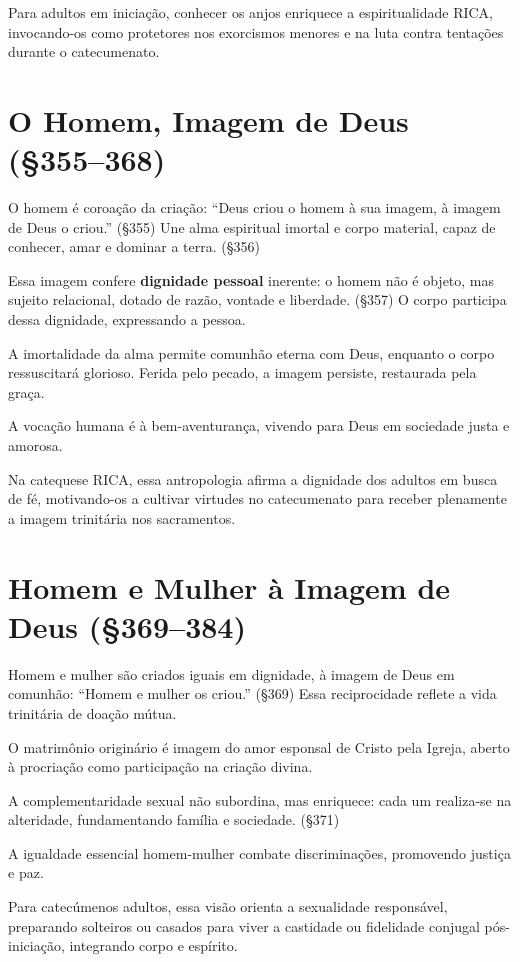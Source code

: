 Para adultos em iniciação, conhecer os anjos enriquece a espiritualidade RICA, invocando-os como protetores nos exorcismos menores e na luta contra tentações durante o catecumenato.

\section{O Homem, Imagem de Deus (\S 355--368)}

O homem é coroação da criação: ``Deus criou o homem à sua imagem, à imagem de Deus o criou.'' (\S 355) Une alma espiritual imortal e corpo material, capaz de conhecer, amar e dominar a terra. (\S 356)

Essa imagem confere \textbf{dignidade pessoal} inerente: o homem não é objeto, mas sujeito relacional, dotado de razão, vontade e liberdade. (\S 357) O corpo participa dessa dignidade, expressando a pessoa.

A imortalidade da alma permite comunhão eterna com Deus, enquanto o corpo ressuscitará glorioso. Ferida pelo pecado, a imagem persiste, restaurada pela graça.

A vocação humana é à bem-aventurança, vivendo para Deus em sociedade justa e amorosa.

Na catequese RICA, essa antropologia afirma a dignidade dos adultos em busca de fé, motivando-os a cultivar virtudes no catecumenato para receber plenamente a imagem trinitária nos sacramentos.

\section{Homem e Mulher à Imagem de Deus (\S 369--384)}

Homem e mulher são criados iguais em dignidade, à imagem de Deus em comunhão: ``Homem e mulher os criou.'' (\S 369) Essa reciprocidade reflete a vida trinitária de doação mútua.

O matrimônio originário é imagem do amor esponsal de Cristo pela Igreja, aberto à procriação como participação na criação divina.

A complementaridade sexual não subordina, mas enriquece: cada um realiza-se na alteridade, fundamentando família e sociedade. (\S 371)

A igualdade essencial homem-mulher combate discriminações, promovendo justiça e paz.

Para catecúmenos adultos, essa visão orienta a sexualidade responsável, preparando solteiros ou casados para viver a castidade ou fidelidade conjugal pós-iniciação, integrando corpo e espírito.

